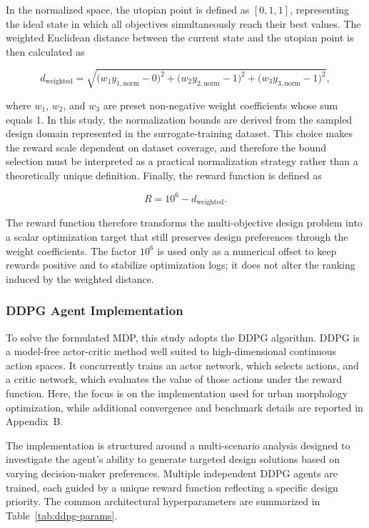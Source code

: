 \documentclass[final,3p,times]{elsarticle}
\begin{document}
In the normalized space, the utopian point is defined as $[0,1,1]$, representing the ideal state in which all objectives simultaneously reach their best values. The weighted Euclidean distance between the current state and the utopian point is then calculated as

\begin{equation}
d_{\mathrm{weighted}} =
\sqrt{
\bigl(w_1y_{1,\mathrm{norm}}-0\bigr)^2 +
\bigl(w_2y_{2,\mathrm{norm}}-1\bigr)^2 +
\bigl(w_3y_{3,\mathrm{norm}}-1\bigr)^2
},
\end{equation}

where $w_1$, $w_2$, and $w_3$ are preset non-negative weight coefficients whose sum equals 1. In this study, the normalization bounds are derived from the sampled design domain represented in the surrogate-training dataset. This choice makes the reward scale dependent on dataset coverage, and therefore the bound selection must be interpreted as a practical normalization strategy rather than a theoretically unique definition. Finally, the reward function is defined as

\begin{equation}
R = 10^6 - d_{\mathrm{weighted}}.
\end{equation}

The reward function therefore transforms the multi-objective design problem into a scalar optimization target that still preserves design preferences through the weight coefficients. The factor $10^6$ is used only as a numerical offset to keep rewards positive and to stabilize optimization logs; it does not alter the ranking induced by the weighted distance.

\subsubsection{DDPG Agent Implementation}

To solve the formulated MDP, this study adopts the DDPG algorithm. DDPG is a model-free actor-critic method well suited to high-dimensional continuous action spaces. It concurrently trains an actor network, which selects actions, and a critic network, which evaluates the value of those actions under the reward function. Here, the focus is on the implementation used for urban morphology optimization, while additional convergence and benchmark details are reported in Appendix~B.

The implementation is structured around a multi-scenario analysis designed to investigate the agent's ability to generate targeted design solutions based on varying decision-maker preferences. Multiple independent DDPG agents are trained, each guided by a unique reward function reflecting a specific design priority. The common architectural hyperparameters are summarized in Table~\ref{tab:ddpg-params}.
\end{document}

